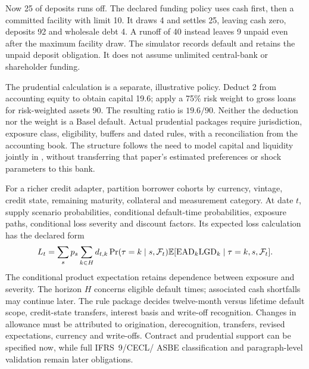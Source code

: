 Now 25 of deposits runs off. The declared funding policy uses cash first,
then a committed facility with limit 10. It draws 4 and settles 25, leaving
cash zero, deposits 92 and wholesale debt 4. A runoff of 40 instead leaves
9 unpaid even after the maximum facility draw. The simulator records default
and retains the unpaid deposit obligation. It does not assume unlimited
central-bank or shareholder funding.

The prudential calculation is a separate, illustrative policy. Deduct 2 from
accounting equity to obtain capital 19.6; apply a 75\% risk weight to gross
loans for risk-weighted assets 90. The resulting ratio is $19.6/90$.
Neither the deduction nor the weight is a Basel default. Actual prudential
packages require jurisdiction, exposure class, eligibility, buffers and dated
rules, with a reconciliation from the accounting book. The structure follows
the need to model capital and liquidity jointly in
\citet[Section 2]{behn2019}, without transferring that paper's estimated
preferences or shock parameters to this bank.

For a richer credit adapter, partition borrower cohorts by currency, vintage,
credit state, remaining maturity, collateral and measurement category. At date
$t$, supply scenario probabilities, conditional default-time probabilities,
exposure paths, conditional loss severity and discount factors. Its expected
loss calculation has the declared form
\[
 L_t=\sum_s p_s\sum_{k\in H}
  d_{t,k}\Pr(\tau=k\mid s,\mathcal F_t)
  \mathbb{E}[\mathrm{EAD}_k\mathrm{LGD}_k\mid\tau=k,s,\mathcal F_t].
\]
The conditional product expectation retains dependence between exposure and
severity. The horizon $H$ concerns eligible default times; associated cash
shortfalls may continue later. The rule package decides twelve-month versus
lifetime default scope, credit-state transfers, interest basis and write-off
recognition. Changes in allowance must be attributed to origination,
derecognition, transfers, revised expectations, currency and write-offs.
Contract and prudential support can be specified now, while full IFRS~9/CECL/
ASBE classification and paragraph-level validation remain later obligations.


